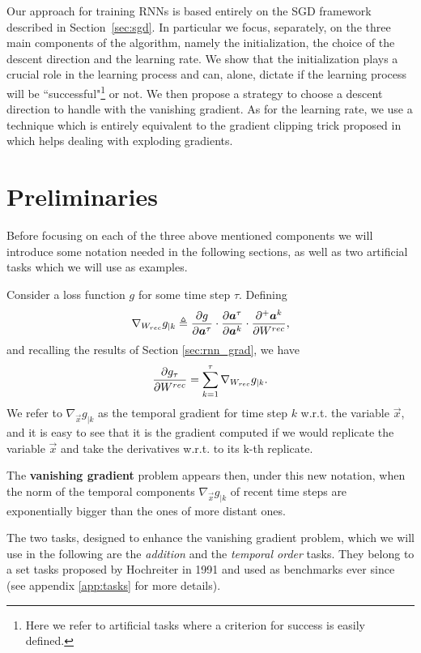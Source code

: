 Our approach for training RNNs is based entirely on the SGD framework described in Section~\ref{sec:sgd}. In particular we focus, separately, on the three main components of the algorithm, namely the initialization, the choice of the descent direction and the learning rate. We show that the initialization plays a crucial role in the learning process and can, alone, dictate if the learning process will be ``successful"\footnote{Here we refer to artificial tasks where a criterion for success is easily defined.} or not. We then propose a strategy to choose a descent direction to handle with the vanishing gradient. As for the learning rate, we use a technique which is entirely equivalent to the gradient clipping trick proposed in \cite{understandingExplodingGradients} which helps dealing with exploding gradients.


\section{Preliminaries}
Before focusing on each of the three above mentioned components we will introduce some notation needed in the following sections, as well as two artificial tasks which we will use as examples.

Consider a loss function $g$ for some time step $\tau$. Defining 
\begin{equation}
\nabla_{W_{rec}} g_{|k}  \triangleq \frac{\partial g}{\partial \boldsymbol{a}^{\tau}} \cdot \frac{\partial \boldsymbol{a}^{\tau}}{\partial \boldsymbol{a}^k} \cdot \frac{\partial^+ \boldsymbol{a}^k}{\partial W^{rec}},
\end{equation}
and recalling the results of Section \ref{sec:rnn_grad}, we have
\begin{equation}
	\frac{\partial g_{\tau}}{\partial W^{rec}} = \sum_{k=1}^{\tau} \nabla_{W_{rec}} g_{|k}.
\end{equation}
We refer to $\nabla_{\vec{x}} g_{|k}$ as the temporal gradient for time step $k$ w.r.t. the variable $\vec{x}$, and it is easy to see that it is the gradient computed if we would replicate the variable $\vec{x}$  and take the derivatives w.r.t. to its k-th replicate.

The \textbf{vanishing gradient} problem appears then, under this new notation, when the norm of the temporal components $\nabla_{\vec{x}} g_{|k}$ of recent time steps  are exponentially bigger than the ones of more distant ones.

The two tasks, designed to enhance the vanishing gradient problem, which we will use in the following are the \textit{addition} and the \textit{temporal order} tasks. They belong to a set tasks proposed by Hochreiter\cite{lstm} in 1991 and used as benchmarks ever since (see appendix \ref{app:tasks} for more details).

